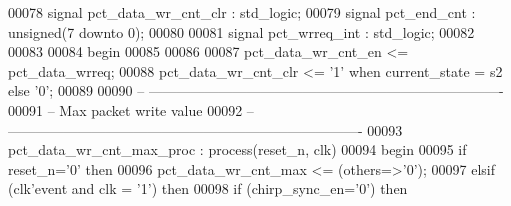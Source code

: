 \begin{DoxyCode}
00078 \textcolor{keywordflow}{signal} \textcolor{vhdlchar}{pct_data_wr_cnt_clr} \textcolor{vhdlchar}{:} \textcolor{comment}{std\_logic};
00079 \textcolor{keywordflow}{signal} \textcolor{vhdlchar}{pct_end_cnt}         \textcolor{vhdlchar}{:} \textcolor{comment}{unsigned}\textcolor{vhdlchar}{(}\textcolor{vhdllogic}{}\textcolor{vhdllogic}{7} \textcolor{keywordflow}{downto} \textcolor{vhdllogic}{}\textcolor{vhdllogic}{0}\textcolor{vhdlchar}{)};
00080 
00081 \textcolor{keywordflow}{signal} \textcolor{vhdlchar}{pct_wrreq_int}       \textcolor{vhdlchar}{:} \textcolor{comment}{std\_logic};
00082 
00083   
00084 \textcolor{vhdlkeyword}{begin}
00085 
00086 
00087 \textcolor{vhdlchar}{pct_data_wr_cnt_en}  \textcolor{vhdlchar}{<=} \textcolor{vhdlchar}{pct_data_wrreq};
00088 \textcolor{vhdlchar}{pct_data_wr_cnt_clr} \textcolor{vhdlchar}{<=} \textcolor{vhdlchar}{'}\textcolor{vhdllogic}{}\textcolor{vhdllogic}{1}\textcolor{vhdlchar}{'} \textcolor{keywordflow}{when} \textcolor{vhdlchar}{current_state} \textcolor{vhdlchar}{=} \textcolor{vhdlchar}{s2} \textcolor{keywordflow}{else} \textcolor{vhdlchar}{'}\textcolor{vhdllogic}{}\textcolor{vhdllogic}{0}\textcolor{vhdlchar}{'};
00089 
00090 \textcolor{keyword}{-- ----------------------------------------------------------------------------}
00091 \textcolor{keyword}{-- Max packet write value}
00092 \textcolor{keyword}{-- ----------------------------------------------------------------------------  }
00093 pct\_data\_wr\_cnt\_max\_proc : \textcolor{keywordflow}{process}(reset_n, clk)
00094 \textcolor{vhdlkeyword}{   begin}
00095       \textcolor{keywordflow}{if} \textcolor{vhdlchar}{reset_n}\textcolor{vhdlchar}{=}\textcolor{vhdlchar}{'}\textcolor{vhdllogic}{}\textcolor{vhdllogic}{0}\textcolor{vhdlchar}{'} \textcolor{keywordflow}{then}
00096          \textcolor{vhdlchar}{pct_data_wr_cnt_max} \textcolor{vhdlchar}{<=} \textcolor{vhdlchar}{(}\textcolor{keywordflow}{others}\textcolor{vhdlchar}{=}\textcolor{vhdlchar}{>}\textcolor{vhdlchar}{'}\textcolor{vhdllogic}{}\textcolor{vhdllogic}{0}\textcolor{vhdlchar}{'}\textcolor{vhdlchar}{)};
00097       \textcolor{keywordflow}{elsif} \textcolor{vhdlchar}{(}\textcolor{vhdlchar}{clk}\textcolor{vhdlchar}{'}\textcolor{vhdlkeyword}{event} \textcolor{keywordflow}{and} \textcolor{vhdlchar}{clk} \textcolor{vhdlchar}{=} \textcolor{vhdlchar}{'}\textcolor{vhdllogic}{}\textcolor{vhdllogic}{1}\textcolor{vhdlchar}{'}\textcolor{vhdlchar}{)} \textcolor{keywordflow}{then}
00098             \textcolor{keywordflow}{if} \textcolor{vhdlchar}{(}\textcolor{vhdlchar}{chirp_sync_en}\textcolor{vhdlchar}{=}\textcolor{vhdlchar}{'}\textcolor{vhdllogic}{}\textcolor{vhdllogic}{0}\textcolor{vhdlchar}{'}\textcolor{vhdlchar}{)} \textcolor{keywordflow}{then}

\end{DoxyCode}
